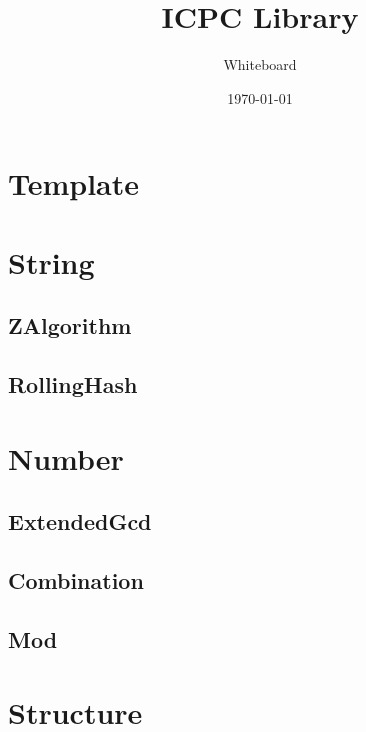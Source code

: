 \documentclass[titlepage, landscape, a4paper, twocolumn, 10pt]{ujarticle}
\begin{document}
\title{ICPC Library}
\author{Whiteboard}
\date{\today}

\maketitle


\section{Template}




\section{String}

\subsection{ZAlgorithm}


\subsection{RollingHash}



\section{Number}

\subsection{ExtendedGcd}


\subsection{Combination}


\subsection{Mod}



\section{Structure}
\end{document}
